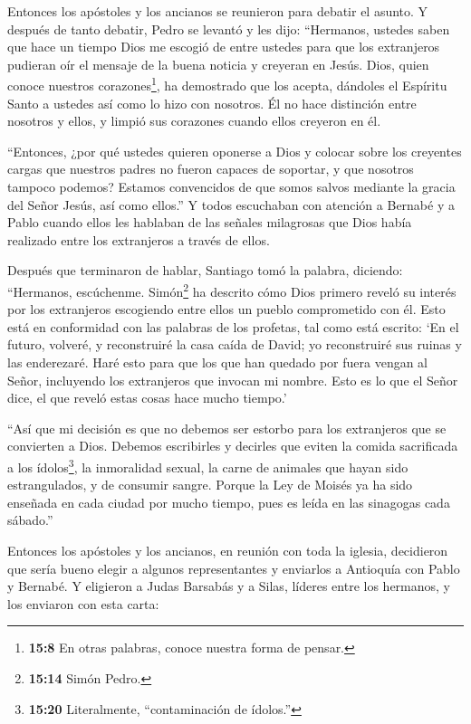  Entonces los apóstoles y los ancianos se reunieron para
debatir el asunto.  Y después de tanto debatir, Pedro se
levantó y les dijo: ``Hermanos, ustedes saben que hace un tiempo Dios me
escogió de entre ustedes para que los extranjeros pudieran oír el
mensaje de la buena noticia y creyeran en Jesús.  Dios,
quien conoce nuestros corazones\footnote{\textbf{15:8} En otras
  palabras, conoce nuestra forma de pensar.}, ha demostrado que los
acepta, dándoles el Espíritu Santo a ustedes así como lo hizo con
nosotros.  Él no hace distinción entre nosotros y ellos, y
limpió sus corazones cuando ellos creyeron en él.

 ``Entonces, ¿por qué ustedes quieren oponerse a Dios y
colocar sobre los creyentes cargas que nuestros padres no fueron capaces
de soportar, y que nosotros tampoco podemos?  Estamos
convencidos de que somos salvos mediante la gracia del Señor Jesús, así
como ellos.''  Y todos escuchaban con atención a Bernabé y
a Pablo cuando ellos les hablaban de las señales milagrosas que Dios
había realizado entre los extranjeros a través de ellos.

 Después que terminaron de hablar, Santiago tomó la
palabra, diciendo: ``Hermanos, escúchenme. 
Simón\footnote{\textbf{15:14} Simón Pedro.} ha descrito cómo Dios
primero reveló su interés por los extranjeros escogiendo entre ellos un
pueblo comprometido con él.  Esto está en conformidad con
las palabras de los profetas, tal como está escrito:  `En
el futuro, volveré, y reconstruiré la casa caída de David; yo
reconstruiré sus ruinas y las enderezaré.  Haré esto para
que los que han quedado por fuera vengan al Señor, incluyendo los
extranjeros que invocan mi nombre.  Esto es lo que el Señor
dice, el que reveló estas cosas hace mucho tiempo.'

 ``Así que mi decisión es que no debemos ser estorbo para
los extranjeros que se convierten a Dios.  Debemos
escribirles y decirles que eviten la comida sacrificada a los
ídolos\footnote{\textbf{15:20} Literalmente, ``contaminación de
  ídolos.''}, la inmoralidad sexual, la carne de animales que hayan sido
estrangulados, y de consumir sangre.  Porque la Ley de
Moisés ya ha sido enseñada en cada ciudad por mucho tiempo, pues es
leída en las sinagogas cada sábado.''

 Entonces los apóstoles y los ancianos, en reunión con toda
la iglesia, decidieron que sería bueno elegir a algunos representantes y
enviarlos a Antioquía con Pablo y Bernabé. Y eligieron a Judas Barsabás
y a Silas, líderes entre los hermanos,  y los enviaron con
esta carta:

